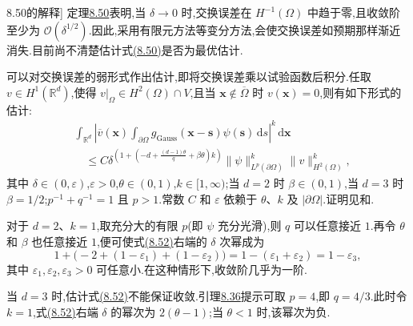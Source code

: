 \begin{note}[定理\hyperref[thm:gaussian-commutation-Hminus1]{8.50}的解释]
\label{note:commutation-Hminus1-interpretation}
定理\hyperref[thm:gaussian-commutation-Hminus1]{8.50}表明,当 $\delta\to0$ 时,交换误差在 $H^{-1}(\Omega)$ 中趋于零,且收敛阶至少为 $\mathcal{O}(\delta^{1/2})$.因此,采用有限元方法等变分方法,会使交换误差如预期那样渐近消失.目前尚不清楚估计式\hyperref[eq:commutation-Hminus1-estimate]{(8.50)}是否为最优估计.
\end{note}

\begin{note}[交换误差的弱形式]
\label{note:weak-commutation-error}
可以对交换误差的弱形式作出估计,即将交换误差乘以试验函数后积分.任取 $v\in H^1(\mathbb{R}^d)$,使得 $v|_\Omega\in H^2(\Omega)\cap V$,且当 $\bm{x}\notin\overline{\Omega}$ 时 $v(\bm{x})=0$,则有如下形式的估计:
\begin{equation}\label{eq:weak-commutation-error}
\begin{aligned}
 &\int_{\mathbb{R}^d}
    \left|\overline{v}(\bm{x})
      \int_{\partial\Omega}
        g_{\mathrm{Gauss}}(\bm{x}-\bm{s})\psi(\bm{s})\,\mathrm{d}s
    \right|^k\,\mathrm{d}\bm{x}\\
 &\quad\le C\delta^{\left(1+\left(-d+
                \frac{(d-1)\theta}{q}+\beta\theta\right)k\right)}
       \|\psi\|_{L^p(\partial\Omega)}^k
       \|v\|_{H^2(\Omega)}^k,
\end{aligned}
\end{equation}
其中 $\delta\in(0,\varepsilon)$,$\varepsilon>0$,$\theta\in(0,1)$,$k\in[1,\infty)$;当 $d=2$ 时 $\beta\in(0,1)$,当 $d=3$ 时 $\beta=1/2$;$p^{-1}+q^{-1}=1$ 且 $p>1$.常数 $C$ 和 $\varepsilon$ 依赖于 $\theta$、$k$ 及 $|\partial\Omega|$.证明见\parencite{DuncaJohnLayton2004}和\parencite[][Section~3.7]{John2004}.

对于 $d=2$、$k=1$,取充分大的有限 $p$(即 $\psi$ 充分光滑),则 $q$ 可以任意接近 $1$.再令 $\theta$ 和 $\beta$ 也任意接近 $1$,便可使式\hyperref[eq:weak-commutation-error]{(8.52)}右端的 $\delta$ 次幂成为
\[
 1+\bigl(-2+(1-\varepsilon_1)+(1-\varepsilon_2)\bigr)
  =1-(\varepsilon_1+\varepsilon_2)=1-\varepsilon_3,
\]
其中 $\varepsilon_1,\varepsilon_2,\varepsilon_3>0$ 可任意小.在这种情形下,收敛阶几乎为一阶.

当 $d=3$ 时,估计式\hyperref[eq:weak-commutation-error]{(8.52)}不能保证收敛.引理\hyperref[lem:les-normal-stress-regularity]{8.36}提示可取 $p=4$,即 $q=4/3$.此时令 $k=1$,式\hyperref[eq:weak-commutation-error]{(8.52)}右端 $\delta$ 的幂次为 $2(\theta-1)$;当 $\theta<1$ 时,该幂次为负.
\end{note}

